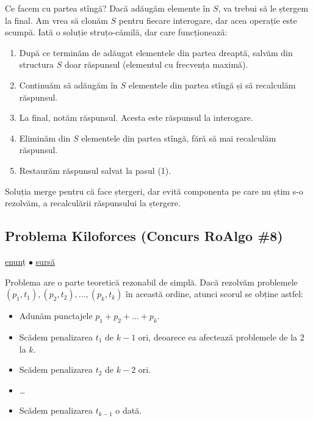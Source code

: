 \documentclass[../main.tex]{subfiles}
\begin{document}
Ce facem cu partea stîngă? Dacă adăugăm elemente în $S$, va trebui să le ștergem la final. Am vrea să clonăm $S$ pentru fiecare interogare, dar acea operație este scumpă. Iată o soluție struțo-cămilă, dar care funcționează:

\begin{enumerate}
  \item După ce terminăm de adăugat elementele din partea dreaptă, salvăm din structura $S$ doar răspunsul (elementul cu frecvența maximă).
  \item Continuăm să adăugăm în $S$ elementele din partea stîngă și să recalculăm răspunsul.
  \item La final, notăm răspunsul. Acesta este răspunsul la interogare.
  \item Eliminăm din $S$ elementele din partea stîngă, fără să mai recalculăm răspunsul.
  \item Restaurăm răspunsul salvat la pasul (1).
\end{enumerate}

Soluția merge pentru că face ștergeri, dar evită componenta pe care nu știm s-o rezolvăm, a recalculării răspunsului la ștergere.

\subsection{Problema Kiloforces (Concurs RoAlgo \#8)}
\label{problem:kiloforces}

\href{https://kilonova.ro/problems/2021}{enunț}
$\bullet$
\hyperref[code:kiloforces]{sursă}

Problema are o parte teoretică rezonabil de simplă. Dacă rezolvăm problemele $(p_1, t_1), (p_2, t_2), \dots, (p_k, t_k)$ în această ordine, atunci scorul se obține astfel:

\begin{itemize}
  \item Adunăm punctajele $p_1 + p_2 + \dots + p_k$.

  \item Scădem penalizarea $t_1$ de $k-1$ ori, deoarece ea afectează problemele de la 2 la $k$.

  \item Scădem penalizarea $t_2$ de $k-2$ ori.

  \item \dots

  \item Scădem penalizarea $t_{k-1}$ o dată.
\end{itemize}
\end{document}
